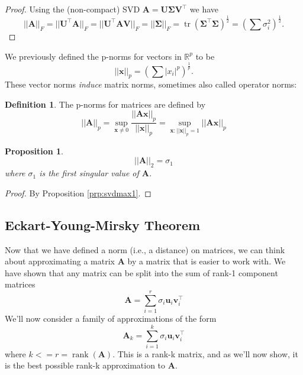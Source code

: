\documentclass[
]{book}
\newtheorem{proposition}{Proposition}[chapter]
\theoremstyle{definition}
\newtheorem{definition}{Definition}[chapter]
\theoremstyle{definition}
\theoremstyle{definition}
\theoremstyle{definition}
\theoremstyle{remark}
\begin{document}
\begin{proof}
Using the (non-compact) SVD
\(\mathbf A= \mathbf U\boldsymbol{\Sigma}\mathbf V^\top\)
we have \[||\mathbf A||_F=||\mathbf U^\top \mathbf A||_F = ||\mathbf U^\top \mathbf A\mathbf V||_F = ||\boldsymbol{\Sigma}||_F=\operatorname{tr}(\boldsymbol{\Sigma}^\top\boldsymbol{\Sigma})^\frac{1}{2}=\left(\sum \sigma_i^2 \right)^\frac{1}{2}.\]
\end{proof}

We previously defined the p-norms for vectors in \(\mathbb{R}^p\) to be
\[||\mathbf x||_p = \left(\sum |x_i|^p\right)^{\frac{1}{p}}.\]
These vector norms \emph{induce} matrix norms, sometimes also called operator norms:
\begin{definition}
\protect\hypertarget{def:matrixnorm}{}{\label{def:matrixnorm} }The p-norms for matrices are defined by
\[||\mathbf A||_p = \sup_{\mathbf x\not=0} \frac{||\mathbf A\mathbf x||_p}{||\mathbf x||_p} = \sup_{\mathbf x: ||\mathbf x||_p=1} ||\mathbf A\mathbf x||_p\]
\end{definition}

\begin{proposition}
\protect\hypertarget{prp:L2matrixnorm}{}{\label{prp:L2matrixnorm} }\[||\mathbf A||_2 = \sigma_1\]
where \(\sigma_1\) is the first singular value of \(\mathbf A\).
\end{proposition}

\begin{proof}
By Proposition \ref{prp:svdmax1}.
\end{proof}

\hypertarget{eckart-young-mirsky-theorem}{%
\subsection{Eckart-Young-Mirsky Theorem}\label{eckart-young-mirsky-theorem}}

Now that we have defined a norm (i.e., a distance) on matrices, we can think about approximating a matrix \(\mathbf A\) by a matrix that is easier to work with. We have shown that any matrix can be split into the sum of rank-1 component matrices
\[\mathbf A= \sum_{i=1}^r \sigma_i \mathbf u_i \mathbf v_i^\top\]
We'll now consider a family of approximations of the form
\begin{equation}
\mathbf A_k = \sum_{i=1}^k \sigma_i \mathbf u_i \mathbf v_i^\top
\label{eq:svdreduced}
\end{equation}
where \(k<=r=\operatorname{rank}(\mathbf A)\). This is a rank-k matrix, and as we'll now show, it is the best possible rank-k approximation to \(\mathbf A\).
\end{document}

